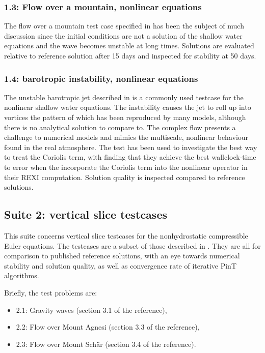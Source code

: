 \documentclass{article}
\begin{document}
\subsubsection{1.3: Flow over a mountain, nonlinear equations}
The flow over a mountain test case specified in
\citet{williamson1992standard} has been the subject of much discussion
since the initial conditions are not a solution of the shallow water
equations and the wave becomes unstable at long times. Solutions are
evaluated relative to reference solution after 15 days and inspected
for stability at 50 days.

\subsubsection{1.4: barotropic instability, nonlinear equations}
The unstable barotropic jet described in \citet{galewsky2004initial}
is a commonly used testcase for the nonlinear shallow water
equations. The instability causes the jet to roll up into vortices the
pattern of which has been reproduced by many models, although there is
no analytical solution to compare to. The complex flow presents a
challenge to numerical models and mimics the multiscale, nonlinear
behaviour found in the real atmosphere. The test has been used to
investigate the best way to treat the Coriolis term, with
\citet{schreiber2019exponential} finding that they achieve the best
wallclock-time to error when the incorporate the Coriolis term into
the nonlinear operator in their REXI computation. Solution quality
is inspected compared to reference solutions.

\subsection{Suite 2: vertical slice testcases}
This suite concerns vertical slice testcases for the nonhydrostatic
compressible Euler equations. The testcases are a subset of those
described in \citet{cotter2022compatible}.  They are all for
comparison to published reference solutions, with an eye towards
numerical stability and solution quality, as well as convergence
rate of iterative PinT algorithms.

Briefly, the test problems
are:
\begin{itemize}
\item 2.1: Gravity waves (section 3.1 of the reference),
\item 2.2: Flow over Mount Agnesi (section 3.3 of the reference),
\item 2.3: Flow over Mount Sch\"ar (section 3.4 of the reference).
\end{itemize}
\end{document}
